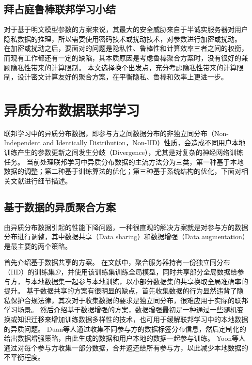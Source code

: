 \subsection{拜占庭鲁棒联邦学习小结}
对于基于明文模型参数的方案来说，其最大的安全威胁来自于半诚实服务器对用户隐私数据的推理\cite{geiping2020inverting}，所以需要使用密码技术或扰动技术，对参数进行加密或扰动。
在加密或扰动之后，要面对的问题是隐私性、鲁棒性和计算效率三者之间的权衡，而现有工作都还有一定的缺陷，其本质原因是考虑鲁棒聚合方案时，没有很好的兼顾隐私性带来的计算限制。
本文选择换个出发点，充分考虑隐私性带来的计算限制，设计密文计算友好的聚合方案，在平衡隐私、鲁棒和效率上更进一步。

\section{异质分布数据联邦学习}
\label{sec:noniid}
联邦学习中的异质分布数据，即参与方之间数据分布的非独立同分布（Non-Independent and Identically Distribution，Non-IID）性质，会造成不同用户本地训练产生的参数更新之间发生分歧（Divergence），尤其是对复杂的神经网络训练任务。
当前处理联邦学习中异质分布数据的主流方法分为三类，第一种基于本地数据的调整；第二种基于训练算法的优化；第三种基于系统结构的优化，下面对相关文献进行细节描述。

\subsection{基于数据的异质聚合方案}
由异质分布数据引起的性能下降问题，一种很直观的解决方案就是对参与方的数据分布进行调整，其中数据共享（Data sharing）和数据增强（Data augmentation）\cite{tanner1987calculation}是最主要的两个策略。

首先介绍基于数据共享的方案\cite{zhao2018federated, yoshida2020hybrid, tuor2021overcoming}。
在文献\cite{zhao2018federated}中，聚合服务器持有一份独立同分布（IID）的训练集$\mathcal{D}$，并使用该训练集训练全局模型，同时共享部分全局数据给参与方，与本地数据集一起参与本地训练，以小部分数据集的共享换取全局准确率的提升。
基于数据共享的方案有很明显的缺点，首先收集数据的行为显然违背了隐私保护合规法律，其次对于收集数据的要求是独立同分布，很难应用于实际的联邦学习场景。
然后介绍基于数据增强的方案\cite{duan2019astraea, shin2020xor, yoonfedmix}，数据增强\cite{tanner1987calculation}最初是一种通过一些随机变换或知识迁移来增加训练数据多样性的技术，也可用于缓解联邦学习中的本地数据的异质问题。
Duan等人\cite{duan2019astraea}通过收集不同参与方的数据标签分布信息，然后定制化的给出数据增强策略，由此生成的数据和用户本地的数据一起参与训练。
Yoon等人\cite{yoonfedmix}通过对每个参与方收集一部分数据，合并返还给所有参与方，以此减少本地数据的不平衡程度。

